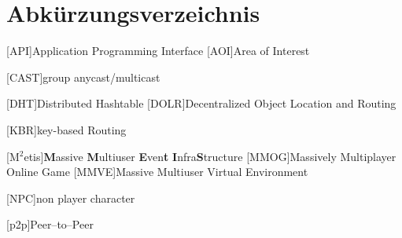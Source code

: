 \chapter*{Abkürzungsverzeichnis}

\pagestyle{useheadings}

\vspace{\topskip}


\begin{acronym}[xxxxxxxxxxxx]
	\setlength{\itemsep}{-\parsep}
	\setlength{\itemindent}{1.5em}
	[API]{Application Programming Interface}
	[AOI]{Area of Interest}

 [CAST]{group anycast/multicast}

	 [DHT]{Distributed Hashtable}
	[DOLR]{Decentralized Object Location and Routing}



	
	
[KBR]{key-based Routing}




	[M$^2$etis]{\textbf{M}assive \textbf{M}ultiuser \textbf{E}ven\textbf{t} \textbf{I}nfra\textbf{S}tructure}	
	[MMOG]{Massively Multiplayer Online Game}
	[MMVE]{Massive Multiuser Virtual Environment}

	[NPC]{non player character}


	
	[p2p]{Peer--to--Peer}

	


\end{acronym}
